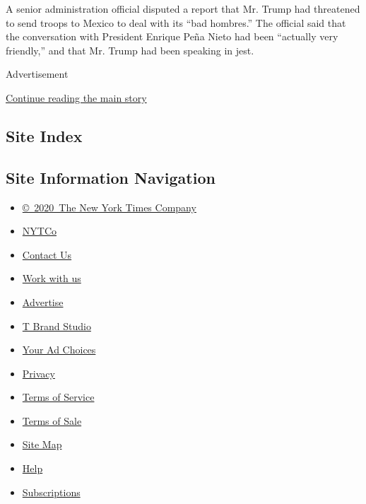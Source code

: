 A senior administration official disputed a report that Mr. Trump had
threatened to send troops to Mexico to deal with its ``bad hombres.''
The official said that the conversation with President Enrique Peña
Nieto had been ``actually very friendly,'' and that Mr. Trump had been
speaking in jest.

Advertisement

\protect\hyperlink{after-bottom}{Continue reading the main story}

\hypertarget{site-index}{%
\subsection{Site Index}\label{site-index}}

\hypertarget{site-information-navigation}{%
\subsection{Site Information
Navigation}\label{site-information-navigation}}

\begin{itemize}
\tightlist
\item
  \href{https://help.nytimes3xbfgragh.onion/hc/en-us/articles/115014792127-Copyright-notice}{©~2020~The
  New York Times Company}
\end{itemize}

\begin{itemize}
\tightlist
\item
  \href{https://www.nytco.com/}{NYTCo}
\item
  \href{https://help.nytimes3xbfgragh.onion/hc/en-us/articles/115015385887-Contact-Us}{Contact
  Us}
\item
  \href{https://www.nytco.com/careers/}{Work with us}
\item
  \href{https://nytmediakit.com/}{Advertise}
\item
  \href{http://www.tbrandstudio.com/}{T Brand Studio}
\item
  \href{https://www.nytimes3xbfgragh.onion/privacy/cookie-policy\#how-do-i-manage-trackers}{Your
  Ad Choices}
\item
  \href{https://www.nytimes3xbfgragh.onion/privacy}{Privacy}
\item
  \href{https://help.nytimes3xbfgragh.onion/hc/en-us/articles/115014893428-Terms-of-service}{Terms
  of Service}
\item
  \href{https://help.nytimes3xbfgragh.onion/hc/en-us/articles/115014893968-Terms-of-sale}{Terms
  of Sale}
\item
  \href{https://spiderbites.nytimes3xbfgragh.onion}{Site Map}
\item
  \href{https://help.nytimes3xbfgragh.onion/hc/en-us}{Help}
\item
  \href{https://www.nytimes3xbfgragh.onion/subscription?campaignId=37WXW}{Subscriptions}
\end{itemize}
